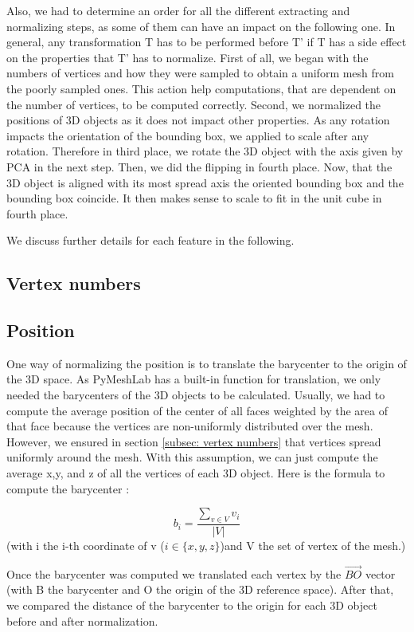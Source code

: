 \documentclass[10pt,twocolumn,letterpaper]{article}
\begin{document}
Also, we had to determine an order for all the different extracting and normalizing steps, as some of them can have an impact on the following one. In general, any transformation T has to be performed before T' if T has a side effect on the properties that T'  has to normalize. First of all, we began with the numbers of vertices and how they were sampled to obtain a uniform mesh from the poorly sampled ones. This action help computations, that are dependent on the number of vertices, to be computed correctly. Second, we normalized the positions of 3D objects as it does not impact other properties. As any rotation impacts the orientation of the bounding box, we applied to scale after any rotation. Therefore in third place, we rotate the 3D object with the axis given by PCA in the next step. Then, we did the flipping in fourth place. Now, that the 3D object is aligned with its most spread axis the oriented bounding box and the bounding box coincide. It then makes sense to scale to fit in the unit cube in fourth place.

We discuss further details for each feature in the following.


\subsection{Vertex numbers}
\label{subsec:vertex numbers}

\subsection{Position}

One way of normalizing the position is to translate the barycenter to the origin of the 3D space. As PyMeshLab has a built-in function for translation, we only needed the barycenters of the 3D objects to be calculated. Usually, we had to compute the average position of the center of all faces weighted by the area of that face because the vertices are non-uniformly distributed over the mesh. However, we ensured in section \ref{subsec: vertex numbers} that vertices spread uniformly around the mesh. With this assumption, we can just compute the average x,y, and z of all the vertices of each 3D object. Here is the formula to compute the barycenter :

$$ b_i = \frac{\sum_{v \in V} v_i}{|V|} $$ (with i the i-th coordinate of v ($i \in \{x,y,z\}$)and V the set of vertex of the mesh.)

Once the barycenter was computed we translated each vertex by the $\overrightarrow{BO}$ vector (with B the barycenter and O the origin of the 3D reference space). After that, we compared the distance of the barycenter to the origin for each 3D object before and after normalization.
	
\end{document}
